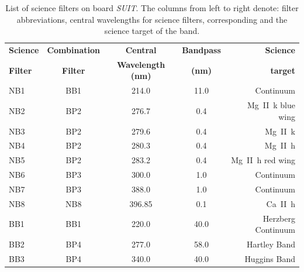 \documentclass[12pt]{spieman}  %
\newcommand{\suit}{{\it{SUIT}}}
\begin{document}
\begin{table}[ht]
\caption{List of science filters on board \suit. The columns from left to right denote: filter abbreviations, central wavelengths for science filters, corresponding  and the science target of the band.} 
\label{tab:science_filters}
\begin{center}
\begin{tabular}{||l|c|c|c|r||}
\hline
\textbf{Science}  &	\textbf{Combination} &	\textbf{Central}		      & 		\textbf{Bandpass} 		& \textbf{Science} \\
\textbf{Filter}	&	\textbf{Filter}     &	\textbf{Wavelength  (nm)}	&		\textbf{(nm)	}	    &	\textbf{target}		\\
\hline
NB1     & BB1 		& 214.0 		    & 11.0 				& Continuum\\
NB2 	& BP2		& 276.7				& 0.4 				& Mg~\rm{II}~k blue wing \\
NB3 	& BP2		& 279.6 			& 0.4 				& Mg~\rm{II}~k\\
NB4 	& BP2		& 280.3				& 0.4 				& Mg~\rm{II}~h\\
NB5		& BP2		& 283.2				& 0.4 				& Mg~\rm{II}~h red wing\\
NB6 	& BP3		& 300.0 			&1.0 				& Continuum\\
NB7 	& BP3		& 388.0				&1.0 				& Continuum\\
NB8		& NB8		& 396.85 			& 0.1 				& Ca~\rm{II}~h\\
BB1 	& BB1		& 220.0				& 40.0 				& Herzberg Continuum \\
BB2 	& BP4		& 277.0 			& 58.0              & Hartley Band\\
BB3 	& BP4		& 340.0				& 40.0              & Huggins Band\\
\hline
\end{tabular}
\end{center}
\end{table}
\end{document}
